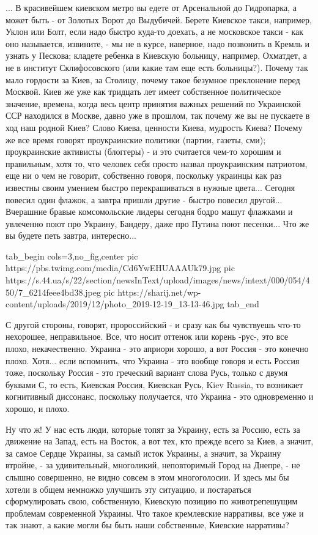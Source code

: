 ... В красивейшем киевском метро вы
едете от Арсенальной до Гидропарка, а может быть - от Золотых Ворот до
Выдубичей. Берете Киевское такси, например, Уклон или Болт, если надо быстро
куда-то доехать, а не московское такси - как оно называется, извините, - мы не
в курсе, наверное, надо позвонить в Кремль и узнать у Пескова; кладете ребенка
в Киевскую больницу, например, Охматдет, а не в институт Склифосовского (или
какие там еще есть больницы?). Почему так мало гордости за Киев, за Столицу,
почему такое безумное преклонение перед Москвой.  Киев же уже как тридцать лет
имеет собственное политическое значение, времена, когда весь центр принятия
важных решений по Украинской ССР находился в Москве, давно уже в прошлом, так
почему же вы не пускаете в ход наш родной Киев? Слово Киева, ценности Киева,
мудрость Киева? Почему же все время говорят проукраинские политики (партии,
газеты, сми); проукраинские активисты (блоггеры) - и это считается чем-то
хорошим и правильным, хотя то, что человек себя просто назвал проукраинским
патриотом, еще ни о чем не говорит, собственно говоря, поскольку украинцы как
раз известны своим умением быстро перекрашиваться в нужные цвета... Сегодня
повесил один флажок, а завтра пришли другие - быстро повесил другой...
Вчерашние бравые комсомольские лидеры сегодня бодро машут флажками и увлеченно
поют про Украину, Бандеру, даже про Путина поют песенки... Что же вы будете петь завтра, интересно... 

\ifcmt
  tab_begin cols=3,no_fig,center
     pic https://pbs.twimg.com/media/Cd6YwEHUAAAUk79.jpg
		 pic https://s.44.ua/s/22/section/newsInText/upload/images/news/intext/000/054/450/7_6214feee4bd38.jpeg
		 pic https://sharij.net/wp-content/uploads/2019/12/photo_2019-12-19_13-13-46.jpg
  tab_end
\fi

С другой
стороны, говорят, пророссийский - и сразу как бы чувствуешь что-то нехорошее,
неправильное. Все, что носит оттенок или корень -рус-, это все плохо,
некачественно.  Украина - это априори хорошо, а вот Россия - это конечно плохо.
Хотя... если вспомнить, что Украина - это вообще говоря и есть Россия тоже,
поскольку Россия - это греческий вариант слова Русь, только с двумя буквами С,
то есть, Киевская Россия, Киевская Русь, Kiev Russia, то возникает когнитивный
диссонанс, поскольку получается, что Украина - это одновременно и хорошо, и
плохо. 

Ну что ж! У нас есть люди, которые топят за Украину, есть за Россию, есть за движение на Запад,
есть на Восток, а вот тех, кто прежде всего за Киев, а значит, за самое Сердце
Украины, за самый исток Украины, а значит, за Украину втройне, - за
удивительный, многоликий, неповторимый Город на Днепре, - не слышно совершенно,
не видно совсем в этом многоголосии. И здесь мы бы хотели в общем немножко
улучшить эту ситуацию, и постараться сформулировать свою, собственную, Киевскую
позицию по животрепешущим проблемам современной Украины. Что такое кремлевские
нарративы, все уже и так знают, а какие могли бы быть наши собственные,
Киевские нарративы?


